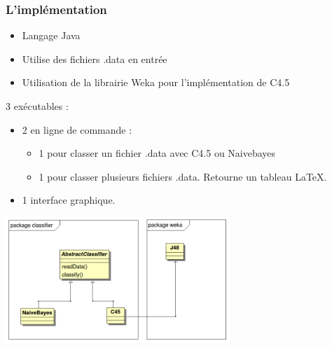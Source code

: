 \begin{frame}
 \frametitle{L'implémentation}

\begin{itemize}
 \item Langage Java
 \item Utilise des fichiers .data en entrée
 \item Utilisation de la librairie Weka pour l'implémentation de C4.5
\end{itemize}
3 exécutables : 
\begin{itemize}
 \item 2 en ligne de commande : 
    \begin{itemize}
      \item 1 pour classer un fichier .data avec C4.5 ou Naivebayes
      \item 1 pour classer plusieurs fichiers .data. Retourne un tableau LaTeX.
    \end{itemize}
  \item 1 interface graphique.
\end{itemize}

\end{frame}

 \begin{frame}%
 \begin{center}

\includegraphics[width=320px]{classDiagram.png}
\end{center}



\end{frame} 